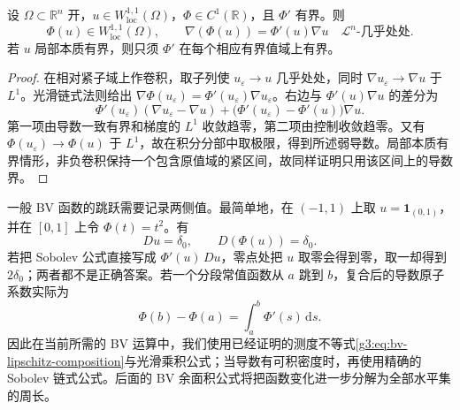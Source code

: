 \begin{proposition}\label{g3:prop:sobolev-c1-chain}
	设 \(\Omega\subset\mathbb R^n\) 开，\(u\in W^{1,1}_{\mathrm{loc}}(\Omega)\)，\(\Phi\in C^1(\mathbb R)\)，且 \(\Phi'\) 有界。则
	\[
		\Phi(u)\in W^{1,1}_{\mathrm{loc}}(\Omega),\qquad
		\nabla(\Phi(u))=\Phi'(u)\nabla u
		\quad\mathcal L^n\text{-几乎处处}.
	\]
	若 \(u\) 局部本质有界，则只须 \(\Phi'\) 在每个相应有界值域上有界。
\end{proposition}
\begin{proof}
	在相对紧子域上作卷积，取子列使 \(u_\varepsilon\to u\) 几乎处处，同时
	\(\nabla u_\varepsilon\to\nabla u\) 于 \(L^1\)。光滑链式法则给出
	\(\nabla\Phi(u_\varepsilon)=\Phi'(u_\varepsilon)\nabla u_\varepsilon\)。右边与 \(\Phi'(u)\nabla u\) 的差分为
	\[
		\Phi'(u_\varepsilon)(\nabla u_\varepsilon-\nabla u)
		+\bigl(\Phi'(u_\varepsilon)-\Phi'(u)\bigr)\nabla u.
	\]
	第一项由导数一致有界和梯度的 \(L^1\) 收敛趋零，第二项由控制收敛趋零。又有 \(\Phi(u_\varepsilon)\to\Phi(u)\) 于 \(L^1\)，故在积分分部中取极限，得到所述弱导数。局部本质有界情形，非负卷积保持一个包含原值域的紧区间，故同样证明只用该区间上的导数界。
\end{proof}

一般 BV 函数的跳跃需要记录两侧值。最简单地，在 \((-1,1)\) 上取 \(u=\mathbf1_{(0,1)}\)，并在 \([0,1]\) 上令 \(\Phi(t)=t^2\)。有
\[
	Du=\delta_0,\qquad D(\Phi(u))=\delta_0.
\]
若把 Sobolev 公式直接写成 \(\Phi'(u)\,Du\)，零点处把 \(u\) 取零会得到零，取一却得到 \(2\delta_0\)；两者都不是正确答案。若一个分段常值函数从 \(a\) 跳到 \(b\)，复合后的导数原子系数实际为
\[
	\Phi(b)-\Phi(a)=\int_a^b\Phi'(s)\,\mathrm ds.
\]
因此在当前所需的 BV 运算中，我们使用已经证明的测度不等式\eqref{g3:eq:bv-lipschitz-composition}与光滑乘积公式；当导数有可积密度时，再使用精确的 Sobolev 链式公式。后面的 BV 余面积公式将把函数变化进一步分解为全部水平集的周长。
